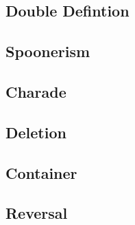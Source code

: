 \subsection{Double Defintion}

\subsection{Spoonerism}

\subsection{Charade}

\subsection{Deletion}

\subsection{Container}

\subsection{Reversal}